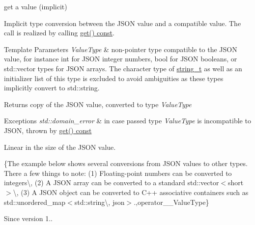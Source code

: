 get a value (implicit) 

Implicit type conversion between the J\+S\+ON value and a compatible value. The call is realized by calling \hyperlink{classnlohmann_1_1basic__json_aba0695744dbcdad65825f91768a8f04f}{get() const}.


\begin{DoxyTemplParams}{Template Parameters}
{\em Value\+Type} & non-\/pointer type compatible to the J\+S\+ON value, for instance {\ttfamily int} for J\+S\+ON integer numbers, {\ttfamily bool} for J\+S\+ON booleans, or {\ttfamily std\+::vector} types for J\+S\+ON arrays. The character type of \hyperlink{classnlohmann_1_1basic__json_ab63e618bbb0371042b1bec17f5891f42}{string\+\_\+t} as well as an initializer list of this type is excluded to avoid ambiguities as these types implicitly convert to {\ttfamily std\+::string}.\\
\hline
\end{DoxyTemplParams}
\begin{DoxyReturn}{Returns}
copy of the J\+S\+ON value, converted to type {\itshape Value\+Type} 
\end{DoxyReturn}

\begin{DoxyExceptions}{Exceptions}
{\em std\+::domain\+\_\+error} & in case passed type {\itshape Value\+Type} is incompatible to J\+S\+ON, thrown by \hyperlink{classnlohmann_1_1basic__json_aba0695744dbcdad65825f91768a8f04f}{get() const}\\
\hline
\end{DoxyExceptions}
Linear in the size of the J\+S\+ON value.

\{The example below shows several conversions from J\+S\+ON values to other types. There a few things to note\+: (1) Floating-\/point numbers can be converted to integers\textbackslash{}, (2) A J\+S\+ON array can be converted to a standard {\ttfamily std\+::vector$<$short$>$}\textbackslash{}, (3) A J\+S\+ON object can be converted to C++ associative containers such as {\ttfamily std\+::unordered\+\_\+map$<$std\+::string\textbackslash{}, json$>$}.,operator\+\_\+\+\_\+\+Value\+Type\}

\begin{DoxySince}{Since}
version 1.. 
\end{DoxySince}
\hypertarget{classnlohmann_1_1basic__json_a1c1aa2d148a3e4ce0d4e50cf5b894f41}{}\label{classnlohmann_1_1basic__json_a1c1aa2d148a3e4ce0d4e50cf5b894f41} 
